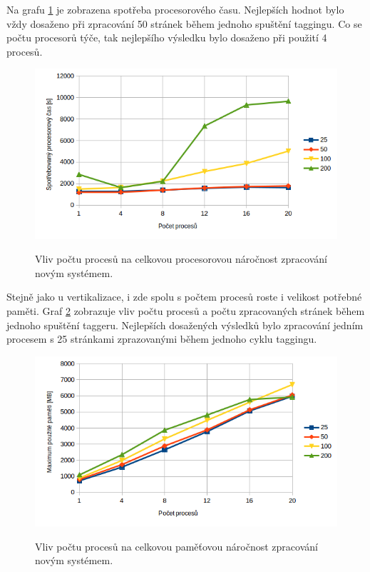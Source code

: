 Na grafu \ref{graph:graph_tagging_procesorovy_cas} je zobrazena spotřeba procesorového času.
Nejlepších hodnot bylo vždy dosaženo při zpracování 50 stránek během jednoho spuštění taggingu.
Co se počtu procesorů týče, tak nejlepšího výsledku bylo dosaženo při použití 4 procesů.

\begin{figure}[H]
    \begin{center}
        \label{graph:graph_tagging_procesorovy_cas}
        \includegraphics[width=1.0\textwidth]{obrazky-figures/graph_tagging_procesorovy_cas.png}
        \caption{Vliv počtu procesů na celkovou procesorovou náročnost zpracování novým systémem.}
    \end{center}
\end{figure}

Stejně jako u vertikalizace, i zde spolu s počtem procesů roste i velikost potřebné paměti.
Graf \ref{graph:graph_tagging_pamet} zobrazuje vliv počtu procesů a počtu zpracovaných stránek
během jednoho spuštění taggeru. Nejlepších dosažených výsledků bylo zpracování jedním procesem
s 25 stránkami zprazovanými během jednoho cyklu taggingu.

\begin{figure}[H]
    \begin{center}
        \label{graph:graph_tagging_pamet}
        \includegraphics[width=1.0\textwidth]{obrazky-figures/graph_tagging_pamet.png}
        \caption{Vliv počtu procesů na celkovou paměťovou náročnost zpracování novým systémem.}
    \end{center}
\end{figure}

